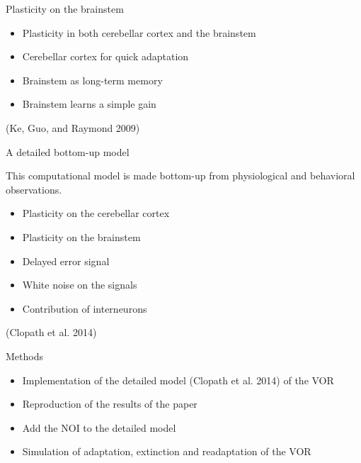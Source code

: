 \documentclass[ignorenonframetext,]{beamer}
\begin{document}
\begin{frame}{Plasticity on the brainstem}

\begin{itemize}
\itemsep1pt\parskip0pt
\item
  Plasticity in both cerebellar cortex and the brainstem
\item
  Cerebellar cortex for quick adaptation
\item
  Brainstem as long-term memory
\item
  Brainstem learns a simple gain
\end{itemize}

(Ke, Guo, and Raymond 2009)

\end{frame}

\begin{frame}{A detailed bottom-up model}

This computational model is made bottom-up from physiological and
behavioral observations.

\begin{itemize}
\itemsep1pt\parskip0pt
\item
  Plasticity on the cerebellar cortex
\item
  Plasticity on the brainstem
\item
  Delayed error signal
\item
  White noise on the signals
\item
  Contribution of interneurons
\end{itemize}

(Clopath et al. 2014)

\end{frame}

\begin{frame}{Methods}

\begin{itemize}
\itemsep1pt\parskip0pt
\item
  Implementation of the detailed model (Clopath et al. 2014) of the VOR
\item
  Reproduction of the results of the paper
\item
  Add the NOI to the detailed model
\item
  Simulation of adaptation, extinction and readaptation of the VOR
\end{itemize}

\end{frame}
\end{document}
